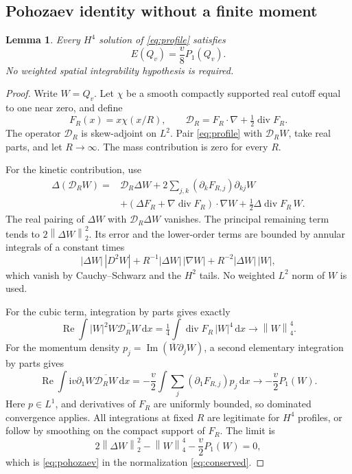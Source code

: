 \documentclass[11pt,a4paper]{article}
\newtheorem{lemma}[theorem]{Lemma}
\theoremstyle{definition}\newtheorem{definition}[theorem]{Definition}
\theoremstyle{remark}\newtheorem{remark}[theorem]{Remark}
\newcommand{\ii}{\mathrm i}
\newcommand{\dd}{\,\mathrm d}
\newcommand{\norm}[1]{\left\|#1\right\|}
\newcommand{\Rea}{\operatorname{Re}}
\newcommand{\Ima}{\operatorname{Im}}
\begin{document}
\subsection{Pohozaev identity without a finite moment}
\begin{lemma}\label{lem:pohozaev}
Every \(H^4\) solution of \eqref{eq:profile} satisfies
\begin{equation}\label{eq:pohozaev}
 E(Q_v)=\frac v8P_1(Q_v).
\end{equation}
No weighted spatial integrability hypothesis is required.
\end{lemma}
\begin{proof}
Write \(W=Q_v\). Let \(\chi\) be a smooth compactly supported real cutoff equal to one near zero, and define
\[
 F_R(x)=x\chi(x/R),\qquad
 \mathcal D_R=F_R\cdot\nabla+\tfrac12\operatorname{div}F_R.
\]
The operator \(\mathcal D_R\) is skew-adjoint on \(L^2\). Pair \eqref{eq:profile} with \(\mathcal D_RW\), take real parts, and let \(R\to\infty\). The mass contribution is zero for every \(R\).

For the kinetic contribution, use
\begin{align*}
 \Delta(\mathcal D_RW)={}&\mathcal D_R\Delta W
 +2\sum_{j,k}(\partial_kF_{R,j})\partial_{kj}W\\
 &+(\Delta F_R+\nabla\operatorname{div}F_R)\cdot\nabla W
 +\tfrac12\Delta\operatorname{div}F_R\,W.
\end{align*}
The real pairing of \(\Delta W\) with \(\mathcal D_R\Delta W\) vanishes. The principal remaining term tends to \(2\norm{\Delta W}_2^2\). Its error and the lower-order terms are bounded by annular integrals of a constant times
\[
 |\Delta W|\,|D^2W|
 +R^{-1}|\Delta W|\,|\nabla W|
 +R^{-2}|\Delta W|\,|W|,
\]
which vanish by Cauchy--Schwarz and the \(H^2\) tails. No weighted \(L^2\) norm of \(W\) is used.

For the cubic term, integration by parts gives exactly
\[
 \Rea\int |W|^2W\overline{\mathcal D_RW}\dd x
 =\tfrac14\int\operatorname{div}F_R\,|W|^4\dd x
 \longrightarrow\norm W_4^4.
\]
For the momentum density \(p_j=\Ima(\overline W\partial_jW)\), a second elementary integration by parts gives
\[
 \Rea\int\ii v\partial_1W\overline{\mathcal D_RW}\dd x
 =-\frac v2\int\sum_j(\partial_1F_{R,j})p_j\dd x
 \longrightarrow-\frac v2P_1(W).
\]
Here \(p\in L^1\), and derivatives of \(F_R\) are uniformly bounded, so dominated convergence applies. All integrations at fixed \(R\) are legitimate for \(H^4\) profiles, or follow by smoothing on the compact support of \(F_R\). The limit is
\[
 2\norm{\Delta W}_2^2-\norm W_4^4-\frac v2P_1(W)=0,
\]
which is \eqref{eq:pohozaev} in the normalization \eqref{eq:conserved}.
\end{proof}
\end{document}
